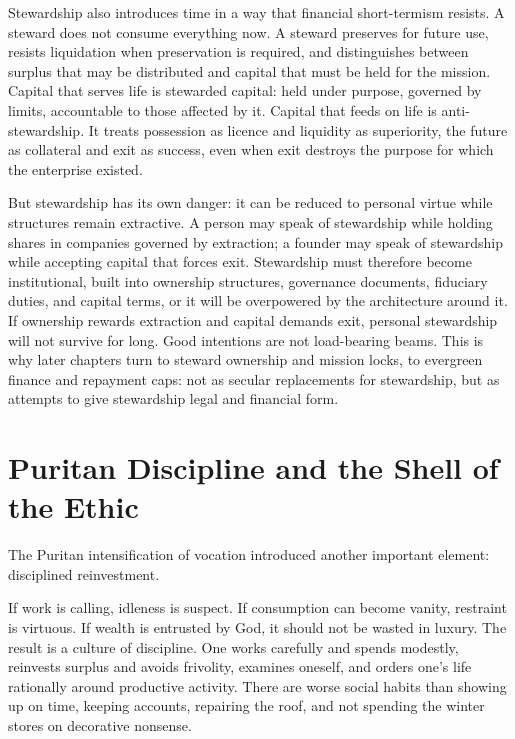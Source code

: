 \documentclass[11pt,a4paper,oneside]{book}
\begin{document}
Stewardship also introduces time in a way that financial short-termism resists. A steward does not consume everything now. A steward preserves for future use, resists liquidation when preservation is required, and distinguishes between surplus that may be distributed and capital that must be held for the mission. Capital that serves life is stewarded capital: held under purpose, governed by limits, accountable to those affected by it. Capital that feeds on life is anti-stewardship. It treats possession as licence and liquidity as superiority, the future as collateral and exit as success, even when exit destroys the purpose for which the enterprise existed.

But stewardship has its own danger: it can be reduced to personal virtue while structures remain extractive. A person may speak of stewardship while holding shares in companies governed by extraction; a founder may speak of stewardship while accepting capital that forces exit. Stewardship must therefore become institutional, built into ownership structures, governance documents, fiduciary duties, and capital terms, or it will be overpowered by the architecture around it. If ownership rewards extraction and capital demands exit, personal stewardship will not survive for long. Good intentions are not load-bearing beams. This is why later chapters turn to steward ownership and mission locks, to evergreen finance and repayment caps: not as secular replacements for stewardship, but as attempts to give stewardship legal and financial form.

\section*{Puritan Discipline and the Shell of the Ethic}

The Puritan intensification of vocation introduced another important element: disciplined reinvestment.

If work is calling, idleness is suspect. If consumption can become vanity, restraint is virtuous. If wealth is entrusted by God, it should not be wasted in luxury. The result is a culture of discipline. One works carefully and spends modestly, reinvests surplus and avoids frivolity, examines oneself, and orders one's life rationally around productive activity. There are worse social habits than showing up on time, keeping accounts, repairing the roof, and not spending the winter stores on decorative nonsense.
\end{document}
